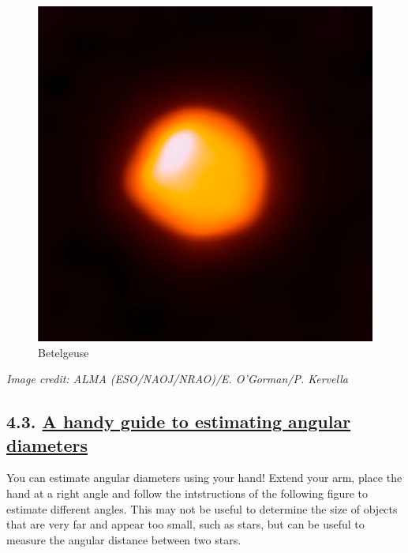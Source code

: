 \documentclass[
  letterpaper,
  DIV=11,
  numbers=noendperiod]{scrartcl}
\begin{document}
\begin{figure}

{\centering \includegraphics{img/Betelgeuse.png}

}

\caption{Betelgeuse}

\end{figure}

\emph{Image credit: ALMA (ESO/NAOJ/NRAO)/E. O'Gorman/P. Kervella}

\hypertarget{a-handy-guide-to-estimating-angular-diameters}{%
\subsection{\texorpdfstring{4.3. \protect\hyperlink{toc0_}{A handy guide
to estimating angular
diameters}}{4.3. A handy guide to estimating angular diameters}}\label{a-handy-guide-to-estimating-angular-diameters}}

You can estimate angular diameters using your hand! Extend your arm,
place the hand at a right angle and follow the intstructions of the
following figure to estimate different angles. This may not be useful to
determine the size of objects that are very far and appear too small,
such as stars, but can be useful to measure the angular distance between
two stars.
\end{document}
